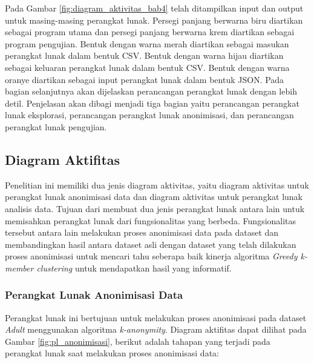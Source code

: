 Pada Gambar \ref{fig:diagram_aktivitas_bab4} telah ditampilkan input dan output untuk masing-masing perangkat lunak. Persegi panjang berwarna biru diartikan sebagai program utama dan persegi panjang berwarna krem diartikan sebagai program pengujian. Bentuk dengan warna merah diartikan sebagai masukan perangkat lunak dalam bentuk CSV. Bentuk dengan warna hijau diartikan sebagai keluaran perangkat lunak dalam bentuk CSV. Bentuk dengan warna oranye diartikan sebagai input perangkat lunak dalam bentuk JSON. Pada bagian selanjutnya akan dijelaskan perancangan perangkat lunak dengan lebih detil. Penjelasan akan dibagi menjadi tiga bagian yaitu perancangan perangkat lunak eksplorasi, perancangan perangkat lunak anonimisasi, dan perancangan perangkat lunak pengujian.

\subsection{Diagram Aktifitas}
Penelitian ini memiliki dua jenis diagram aktivitas,  yaitu diagram aktivitas untuk perangkat lunak anonimisasi data dan diagram aktivitas untuk perangkat lunak analisis data. Tujuan dari membuat dua jenis perangkat lunak antara lain untuk memisahkan perangkat lunak dari fungsionalitas yang berbeda. Fungsionalitas tersebut antara lain melakukan proses anonimisasi data pada dataset dan membandingkan hasil antara dataset asli dengan dataset yang telah dilakukan proses anonimisasi untuk mencari tahu seberapa baik kinerja algoritma \textit{Greedy k-member clustering} untuk mendapatkan hasil yang informatif.

\subsubsection{Perangkat Lunak Anonimisasi Data}
Perangkat lunak ini bertujuan untuk melakukan proses anonimisasi pada dataset \textit{Adult} menggunakan algoritma \textit{k-anonymity}. Diagram aktifitas dapat dilihat pada Gambar \ref{fig:pl_anonimisasi}, berikut adalah tahapan yang terjadi pada perangkat lunak saat melakukan proses anonimisasi data:

